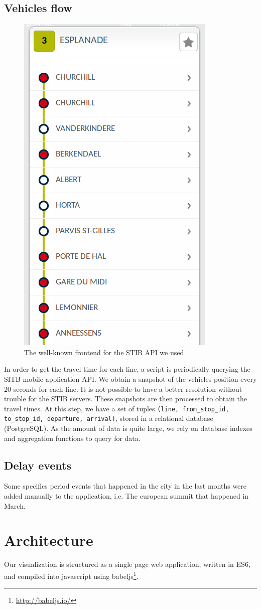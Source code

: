 \documentclass[11pt]{article}%
\begin{document}
\subsection{Vehicles flow}
\begin{figure}[H]
    \center
    \includegraphics[width=.3\textwidth]{stibmobile.png}
    \caption{\label{fig:stibmobile-app} The well-known frontend for the STIB API we used}
\end{figure}

In order to get the travel time for each line, a script is periodically querying the SITB mobile application API. We obtain a snapshot of the vehicles position every 20 seconds for each line. It is not possible to have a better resolution without trouble for the STIB servers. These snapshots are then processed to obtain the travel times. At this step, we have a set of tuples \texttt{(line, from\_stop\_id, to\_stop\_id, departure, arrival)}, stored in a relational database (PostgreSQL). As the amount of data is quite large, we rely on database indexes and aggregation functions to query for data.

\subsection{Delay events}
Some specifics period events that happened in the city in the last months were added manually to the application, i.e. The european summit that happened in March.                       
                       
\section{Architecture}
Our visualization is structured as a single page web application, written in ES6, and compiled into javascript using babeljs\footnote{\url{http://babeljs.io/}}.
\end{document}
